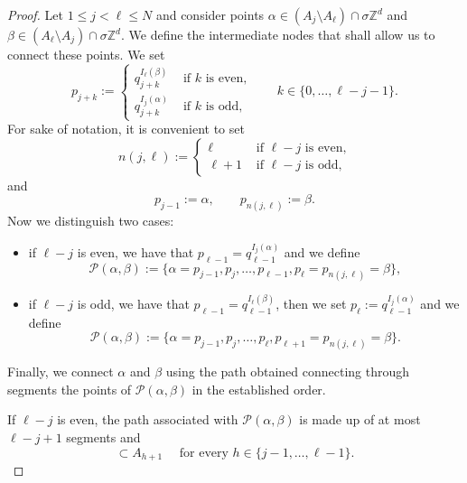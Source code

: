 \documentclass[10pt,a4paper]{amsart}
\def\ZZ{{\mathbb Z}}
\newcommand{\s}{\sigma}
\begin{document}
\begin{proof}
Let $1\leq j<\ell\leq N$ and consider points $\alpha\in (A_j\setminus A_\ell)\cap\s\ZZ^d$ and $\beta \in (A_\ell\setminus A_j)\cap\s\ZZ^d$. We define the intermediate nodes that shall allow us to connect these points. We set
 \begin{equation*}
     p_{j+k}:=\begin{cases}
         q_{j+k}^{I_\ell(\beta)} & \text{ if } k \text{ is even,}\\[5pt]
         q_{j+k}^{I_j(\alpha)} & \text{ if } k \text{ is odd,}
     \end{cases}
     \qquad k\in\{0,\dots,\ell-j-1\}.
 \end{equation*}
For sake of notation, it is convenient to set 
 \begin{equation*}
n(j,\ell):= \begin{cases}
        \ell & \text{ if } \ell-j \text{ is even,} \\
     \ell+1 & \text{ if } \ell-j \text{ is odd,}
    \end{cases}   
\end{equation*}
and 
\begin{equation*}
    p_{j-1}:=\alpha, \qquad p_{n(j,\ell)}:=\beta.
\end{equation*}
Now we distinguish two cases:
\begin{itemize}
 \item if $\ell-j$ is even, we have that $p_{\ell-1}=q_{\ell-1}^{I_j(\alpha)}$ and we define
 \begin{equation*}
     \mathcal P(\alpha,\beta):=
        \{\alpha=p_{j-1}, p_j, \dots, p_{\ell-1}, p_\ell=p_{n(j,\ell)}=\beta\}, 
 \end{equation*}
\item if $\ell-j$ is odd, we have that $p_{\ell-1}=q_{\ell-1}^{I_\ell(\beta)}$, then we set $p_\ell:=q_{\ell-1}^{I_j(\alpha)}$ and we define
\begin{equation*}
    \mathcal P(\alpha,\beta):=\{\alpha=p_{j-1}, p_j, \dots, p_{\ell}, p_{\ell+1}=p_{n(j,\ell)}=\beta\} .
\end{equation*}   
 \end{itemize}
Finally, we connect $\alpha$ and $\beta$ using the path obtained connecting through segments the points of $\mathcal P(\alpha,\beta)$ in the established order.

If $\ell-j$ is even, the path associated with $\mathcal P(\alpha,\beta)$ is made up of at most $\ell-j+1$ segments and 
\begin{equation*}
 [p_h,p_{h+1}]\subset A_{h+1} \quad \text{ for every } h\in\{j-1,\dots, \ell-1\}.
\end{equation*}


\end{proof}
\end{document}
